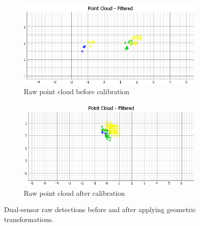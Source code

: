 \begin{figure}[ht]
    \centering
    \begin{subfigure}[b]{0.45\textwidth}
        \includegraphics[width=\textwidth]{images/dualSensorCalib_2mts.png}
        \caption{Raw point cloud before calibration}
    \end{subfigure}
    \hfill
    \begin{subfigure}[b]{0.45\textwidth}
        \includegraphics[width=\textwidth]{images/AFTERdualSensorCalib_2mts.png}
        \caption{Raw point cloud after calibration}
    \end{subfigure}
    \caption{Dual-sensor raw detections before and after applying geometric transformations.}
    \label{fig:dualSensorCalib_rawComparison}
\end{figure}

